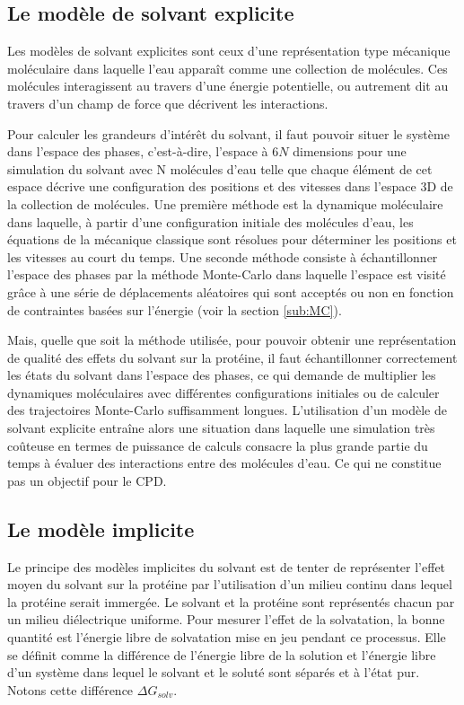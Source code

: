 \subsection{Le modèle de solvant explicite}

Les modèles de solvant explicites sont ceux d'une représentation type mécanique moléculaire dans laquelle l'eau apparaît comme une collection de molécules. Ces molécules interagissent au travers d'une énergie potentielle, ou autrement dit au travers d'un champ de force que décrivent les interactions.


Pour calculer les grandeurs d'intérêt du solvant, il faut pouvoir situer le système dans l'espace des phases, c'est-à-dire, l'espace à $6 N$ dimensions pour une simulation du solvant avec N molécules d'eau telle que chaque élément de cet espace décrive une configuration des positions et des vitesses dans l'espace 3D de la collection de molécules.
Une première méthode est la dynamique moléculaire dans laquelle, à partir d'une configuration initiale des molécules d'eau, les équations de la mécanique classique sont résolues pour déterminer les positions et les vitesses au court du temps. Une seconde méthode consiste à échantillonner l'espace des phases par la méthode Monte-Carlo dans laquelle l'espace est visité grâce à une série de déplacements aléatoires qui sont acceptés ou non en fonction de contraintes basées sur l'énergie (voir la section \ref{sub:MC}).

Mais, quelle que soit la méthode utilisée, pour pouvoir obtenir une représentation de qualité des effets du solvant sur la protéine, il faut échantillonner correctement les états du solvant dans l'espace des phases, ce qui demande de multiplier les dynamiques moléculaires avec différentes configurations initiales ou de calculer des trajectoires Monte-Carlo suffisamment longues.
L'utilisation d'un modèle de solvant explicite entraîne alors une situation dans laquelle une simulation très coûteuse en termes de puissance de calculs consacre la plus grande partie du temps à évaluer des interactions entre des molécules d'eau. Ce qui ne constitue pas un objectif pour le CPD.

\subsection{Le modèle implicite}

Le principe des modèles implicites du solvant est de tenter de représenter l'effet moyen du solvant sur la protéine par l'utilisation d'un milieu continu dans lequel la protéine serait immergée. Le solvant et la protéine sont représentés chacun par un milieu diélectrique uniforme.
Pour mesurer l'effet de la solvatation, la bonne quantité est l'énergie libre de solvatation mise en jeu pendant ce processus. Elle se définit comme la différence de l'énergie libre de la solution et l'énergie libre d'un système dans lequel le solvant et le soluté sont séparés et à l'état pur. Notons cette différence $\Delta G_{solv}$.

